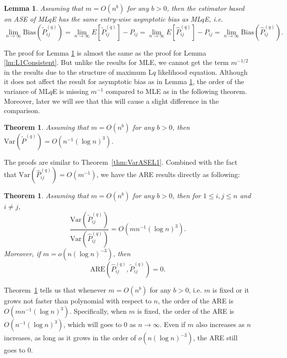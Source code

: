 \documentclass[a4paper]{article}
\newtheorem{lemma}[fact]{Lemma}
\newtheorem{theorem}[fact]{Theorem}
\renewcommand{\hat}{\widehat}
\begin{document}
\begin{lemma}
\label{lm:LqConsistent}
Assuming that $m = O(n^b)$ for any $b > 0$, then the estimator based on ASE of ML$q$E has the same entry-wise asymptotic bias as ML$q$E, i.e.
\[
	\lim_{n \to \infty} \mathrm{Bias}(\widetilde{P}_{ij}^{(q)}) = \lim_{n \to \infty} E[\widetilde{P}_{ij}^{(q)}] - P_{ij} = \lim_{n \to \infty} E[\hat{P}^{(q)}_{ij}] - P_{ij}
    = \lim_{n \to \infty} \mathrm{Bias}(\hat{P}_{ij}^{(q)}).
\]
\end{lemma}

The proof for Lemma \ref{lm:LqConsistent} is almost the same as the proof for Lemma \ref{lm:L1Consistent}. But unlike the results for MLE, we cannot get the term $m^{-1/2}$ in the results due to the structure of maximum L$q$ likelihood equation. Although it does not affect the result for asymptotic bias as in Lemma \ref{lm:LqConsistent}, the order of the variance of ML$q$E is missing $m^{-1}$ compared to MLE as in the following theorem. Moreover, later we will see that this will cause a slight difference in the comparison. 

\begin{theorem}
\label{thm:VarASELq}
Assuming that $m = O(n^b)$ for any $b > 0$, then $\mathrm{Var}(\widetilde{P}^{(q)}) = O(n^{-1} (\log n)^3)$.
\end{theorem}

The proofs are similar to Theorem~\ref{thm:VarASEL1}. Combined with the fact that $\mathrm{Var}(\hat{P}_{ij}^{(q)}) = O(m^{-1})$, we have the ARE results directly as following:

\begin{theorem}
\label{thm:ARELq}
Assuming that $m = O(n^b)$ for any $b > 0$,  then for $1 \le i, j \le n$ and $i \ne j$,
\[
	\frac{\mathrm{Var}(\widetilde{P}_{ij}^{(q)})}{\mathrm{Var}(\hat{P}_{ij}^{(q)})}
    = O(m n^{-1} (\log n)^3).
\]
Moreover, if $m = o(n (\log n)^{-3})$, then
\[
	\mathrm{ARE}(\hat{P}_{ij}^{(q)}, \widetilde{P}_{ij}^{(q)}) = 0.
\]
\end{theorem}

Theorem~\ref{thm:ARELq} tells us that whenever $m = O(n^b)$ for any $b > 0$, i.e. $m$ is fixed or it grows not faster than polynomial with respect to $n$, the order of the ARE is $O(m n^{-1} (\log n)^3)$. Specifically, when $m$ is fixed, the order of the ARE is $O(n^{-1} (\log n)^3)$, which will goes to 0 as $n \to \infty$. Even if $m$ also increases as $n$ increases, as long as it grows in the order of $o(n (\log n)^{-3})$, the ARE still goes to 0. 
\end{document}
